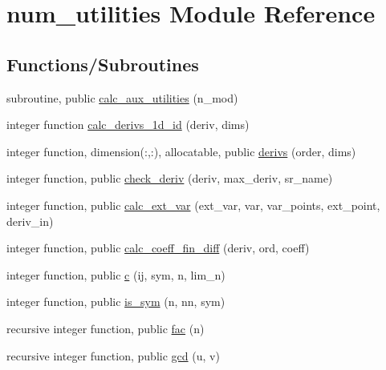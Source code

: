 \hypertarget{namespacenum__utilities}{}\section{num\+\_\+utilities Module Reference}
\label{namespacenum__utilities}
\subsection*{Functions/\+Subroutines}
\begin{DoxyCompactItemize}
\item 
subroutine, public \hyperlink{namespacenum__utilities_af461ae4c95a7a45da875dcf311e323f5}{calc\+\_\+aux\+\_\+utilities} (n\+\_\+mod)
\item 
integer function \hyperlink{namespacenum__utilities_af2e9ffd7ce2f9391bf8b6f1c344fabca}{calc\+\_\+derivs\+\_\+1d\+\_\+id} (deriv, dims)
\item 
integer function, dimension(\+:,\+:), allocatable, public \hyperlink{namespacenum__utilities_ac827c18dd05a9b5a06675eac942f3b51}{derivs} (order, dims)
\item 
integer function, public \hyperlink{namespacenum__utilities_a00f4cfe18a734eaa5d66f529e52f7c31}{check\+\_\+deriv} (deriv, max\+\_\+deriv, sr\+\_\+name)
\item 
integer function, public \hyperlink{namespacenum__utilities_a2d5d9c66db19fb6edeeb50db6182397f}{calc\+\_\+ext\+\_\+var} (ext\+\_\+var, var, var\+\_\+points, ext\+\_\+point, deriv\+\_\+in)
\item 
integer function, public \hyperlink{namespacenum__utilities_a87132bd5006387bcc2afe5ca375f0830}{calc\+\_\+coeff\+\_\+fin\+\_\+diff} (deriv, ord, coeff)
\item 
integer function, public \hyperlink{namespacenum__utilities_a5ee3fbd1fe67d0deefc7194631389f2a}{c} (ij, sym, n, lim\+\_\+n)
\item 
integer function, public \hyperlink{namespacenum__utilities_a4e6994b5c92b3d16c8538b54db0beadd}{is\+\_\+sym} (n, nn, sym)
\item 
recursive integer function, public \hyperlink{namespacenum__utilities_a43ab60f9e202b55221373286a5bbb954}{fac} (n)
\item 
recursive integer function, public \hyperlink{namespacenum__utilities_a3d0d04a582b3a528fc7f9975d5d2a807}{gcd} (u, v)
\end{DoxyCompactItemize}
